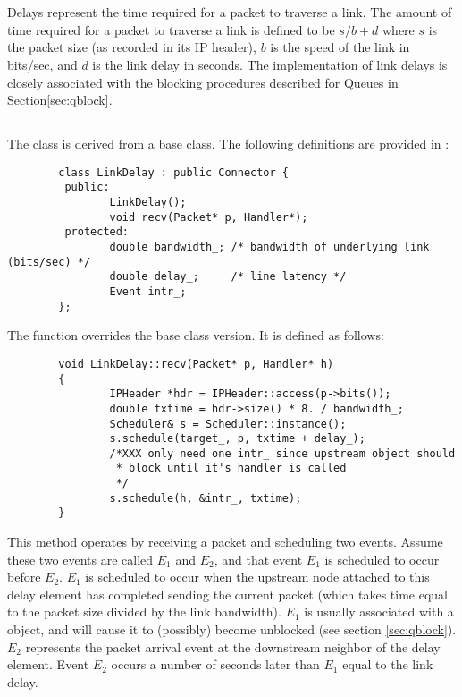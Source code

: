 %
%
\section{}

Delays represent the time required for a packet to
traverse a link.
The amount of time required for a packet to traverse a link
is defined to be $s/b + d$ where $s$ is the packet size
(as recorded in its IP header), $b$ is the speed of the link
in bits/sec, and $d$ is the link delay in seconds.
The implementation of link delays is closely associated with
the blocking procedures described for Queues in
Section\ref{sec:qblock}.

\subsection{}

The  class is derived from a
 base class.
The following definitions are provided in :
\begin{small}
\begin{verbatim}
        class LinkDelay : public Connector {
         public:
                LinkDelay();
                void recv(Packet* p, Handler*);
         protected:
                double bandwidth_; /* bandwidth of underlying link (bits/sec) */
                double delay_;     /* line latency */
                Event intr_;
        };

\end{verbatim}
\end{small}

The  function overrides the  base class version.
It is defined as follows:
\begin{small}
\begin{verbatim}
        void LinkDelay::recv(Packet* p, Handler* h)
        {
                IPHeader *hdr = IPHeader::access(p->bits());
                double txtime = hdr->size() * 8. / bandwidth_;
                Scheduler& s = Scheduler::instance();
                s.schedule(target_, p, txtime + delay_);
                /*XXX only need one intr_ since upstream object should
                 * block until it's handler is called
                 */
                s.schedule(h, &intr_, txtime);
        }
\end{verbatim}
\end{small}
This method operates by receiving a packet and scheduling two
events.
Assume these two events are called $E_1$ and $E_2$, and that
event $E_1$ is scheduled to occur before $E_2$.
$E_1$ is scheduled to occur when the upstream node attached to this
delay element has completed sending the current packet
(which takes time equal to the packet size divided by the link bandwidth).
$E_1$ is usually associated with a  object, and will
cause it to (possibly) become unblocked (see section \ref{sec:qblock}).
$E_2$ represents the packet arrival event at the downstream neighbor
of the delay element.
Event $E_2$ occurs a number of seconds later than $E_1$ equal to the
link delay.

